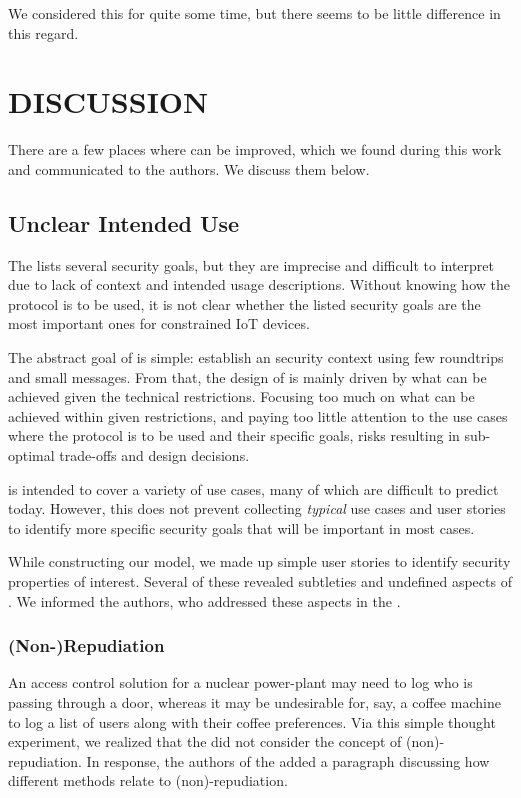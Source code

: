 \documentclass[runningheads]{llncs}
\begin{document}
We considered this for quite some time, but there seems to be little difference
in this regard.
%

\section{\uppercase{Discussion}}
\label{sec:discussion}
There are a few places where \mEdhoc{} can be improved,
which we found during this work and communicated to the authors.
%
We discuss them below.
%

\subsection{Unclear Intended Use}
\label{sec:unclearProtocolUse}
%
The \mEdhoc{} \mSpec{} lists several security goals, but they are
imprecise and difficult to interpret due to lack of context and intended usage
descriptions.
%
Without knowing how the protocol is to be used,
it is not clear whether the listed security goals are the most important ones
for constrained IoT devices.
%

The abstract goal of \mEdhoc{} is simple: establish an \mOscore{} security
context using few roundtrips and small messages.
%
From that, the design of \mEdhoc{} is mainly driven by what
can be achieved given the technical restrictions.
%
Focusing too much on what can be achieved within given restrictions, and paying
too little attention to the use cases where the
protocol is to be used and their specific goals, risks resulting in
sub-optimal trade-offs and design decisions.
%

\mEdhoc{} is intended to cover a variety of use cases, many of which are
difficult to predict today.
%
However, this does not
prevent collecting \emph{typical} use cases and user stories
to identify more specific security goals that will be important in most cases.
%

While constructing our model, we made up simple user stories to identify
security properties of interest.
%
Several of these revealed subtleties and undefined aspects of \mEdhoc{}.
%
We informed the \mEdhoc{} authors, who addressed these aspects in the
\mSpec{}.
%

\subsubsection{(Non-)Repudiation}
An access control solution for a nuclear power-plant may need to log who is
passing through a door, whereas it may be undesirable for, say, a coffee
machine to log a list of users along with their coffee preferences.
%
Via this simple thought experiment, we realized that the \mSpec{} did not
consider the concept of (non)-repudiation.
%
In response, the authors of the \mSpec{} added a paragraph discussing how
different methods relate to (non)-repudiation.
\end{document}
